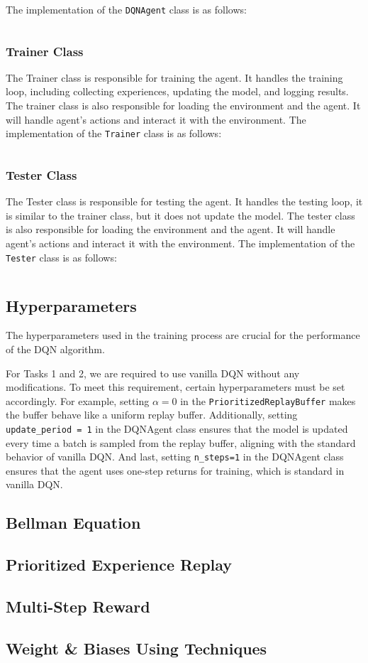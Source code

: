 The implementation of the \texttt{DQNAgent} class is as follows:
\inputminted[firstline=85]{python}{../dqn.py}

\subsubsection{Trainer Class}

The Trainer class is responsible for training the agent.
It handles the training loop, including collecting experiences, updating the model, and logging results.
The trainer class is also responsible for loading the environment and the agent. It will handle agent's actions and interact it with the environment.
The implementation of the \texttt{Trainer} class is as follows:
\inputminted[firstline=18,lastline=170]{python}{../trainer.py}

\subsubsection{Tester Class}

The Tester class is responsible for testing the agent.
It handles the testing loop, it is similar to the trainer class, but it does not update the model.
The tester class is also responsible for loading the environment and the agent.
It will handle agent's actions and interact it with the environment.
The implementation of the \texttt{Tester} class is as follows:
\inputminted[firstline=19,lastline=102]{python}{../tester.py}

\subsection{Hyperparameters}

The hyperparameters used in the training process are crucial for the performance of the DQN algorithm.

For Tasks 1 and 2, we are required to use vanilla DQN without any modifications.
To meet this requirement, certain hyperparameters must be set accordingly.
For example, setting $\alpha=0$ in the \texttt{PrioritizedReplayBuffer} makes the buffer behave like a uniform replay buffer.
Additionally, setting \texttt{update\_period = 1} in the DQNAgent class ensures that the model is updated every time a batch is sampled from the replay buffer, aligning with the standard behavior of vanilla DQN.
And last, setting \texttt{n\_steps=1} in the DQNAgent class ensures that the agent uses one-step returns for training, which is standard in vanilla DQN.


\subsection{Bellman Equation}
\subsection{Prioritized Experience Replay}
\label{sec:per}

\subsection{Multi-Step Reward}
\subsection{Weight \& Biases Using Techniques}
